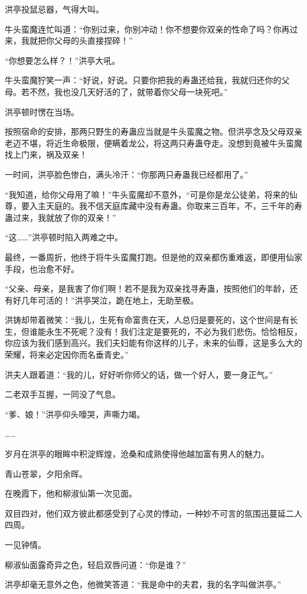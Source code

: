 \begin{this_body}
洪亭投鼠忌器，气得大叫。

牛头蛮魔连忙叫道：“你别过来，你别冲动！你不想要你双亲的性命了吗？你再过来，我就把你父母的头直接捏碎！”

“你想要怎么样？！”洪亭大吼。

牛头蛮魔狞笑一声：“好说，好说。只要你把我的寿蛊还给我，我就归还你的父母。若不然，我也没几天好活的了，就带着你父母一块死吧。”

洪亭顿时愣在当场。

按照宿命的安排，那两只野生的寿蛊应当就是牛头蛮魔之物。但洪亭念及父母双亲老迈不堪，将近生命极限，便瞒着龙公，将这两只寿蛊夺走。没想到竟被牛头蛮魔找上门来，祸及双亲！

一时间，洪亭脸色惨白，满头冷汗：“你那两只寿蛊我已经都用了。”

“我知道，给你父母用了嘛！”牛头蛮魔却不意外，“可是你是龙公徒弟，将来的仙尊，要入主天庭的。我不信天庭库藏中没有寿蛊。你取来三百年，不，三千年的寿蛊过来，我就放了你的双亲！”

“这……”洪亭顿时陷入两难之中。

最终，一番周折，他终于将牛头蛮魔打跑。但是他的双亲都伤重难返，即便用仙家手段，也治愈不好。

“父亲、母亲，是我害了你们啊！若不是我为双亲找寻寿蛊，按照他们的年龄，还有好几年可活的！”洪亭哭泣，跪在地上，无助至极。

洪铸却带着微笑：“我儿，生死有命富贵在天，人总归是要死的，这个世间是有长生，但谁能永生不死呢？没有！我们注定是要死的，不必为我们悲伤。恰恰相反，你应该为我们感到高兴。我们夫妇能有你这样的儿子，未来的仙尊，这是多么大的荣耀，将来必定因你而名垂青史。”

洪夫人跟着道：“我的儿，好好听你师父的话，做一个好人，要一身正气。”

二老双手互握，一同没了气息。

“爹、娘！”洪亭仰头嚎哭，声嘶力竭。

……

岁月在洪亭的眼眸中积淀辉煌，沧桑和成熟使得他越加富有男人的魅力。

青山苍翠，夕阳余晖。

在晚霞下，他和柳淑仙第一次见面。

双目四对，他们双方彼此都感受到了心灵的悸动，一种妙不可言的氛围迅蔓延二人四周。

一见钟情。

柳淑仙面露奇异之色，轻启双唇问道：“你是谁？”

洪亭却毫无意外之色，他微笑答道：“我是命中的夫君，我的名字叫做洪亭。”


\end{this_body}
